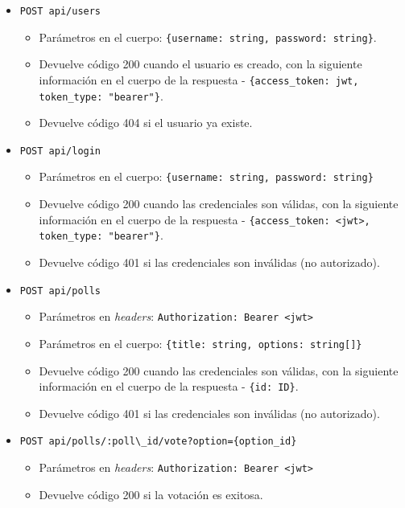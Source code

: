 \documentclass[11pt]{article}
\newcommand{\english}[1]{\textit{#1}}
\begin{document}
\begin{itemize}
    \item \lstinline|POST api/users|
    \begin{itemize}
        \item Parámetros en el cuerpo: \lstinline|{username: string, password: string}|.
        \item Devuelve código 200 cuando el usuario es creado, con la siguiente información en el cuerpo de la respuesta - \lstinline|{access_token: jwt, token_type: "bearer"}|.
        \item Devuelve código 404 si el usuario ya existe.
    \end{itemize}
    \item \lstinline|POST api/login|
    \begin{itemize}
        \item Parámetros en el cuerpo: \lstinline|{username: string, password: string}|
        \item Devuelve código 200 cuando las credenciales son válidas, con la siguiente información en el cuerpo de la respuesta - \lstinline|{access_token: <jwt>, token_type: "bearer"}|.
        \item Devuelve código 401 si las credenciales son inválidas (no autorizado).  
    \end{itemize}
    \item \lstinline|POST api/polls|
    \begin{itemize}
        \item Parámetros en \english{headers}: \lstinline|Authorization: Bearer <jwt>|
        \item Parámetros en el cuerpo: \lstinline|{title: string, options: string[]}|
        \item Devuelve código 200 cuando las credenciales son válidas, con la siguiente información en el cuerpo de la respuesta - \lstinline|{id: ID}|.
        \item Devuelve código 401 si las credenciales son inválidas (no autorizado).  
    \end{itemize}
    \item \lstinline|POST api/polls/:poll\_id/vote?option={option_id}|
    \begin{itemize}
        \item Parámetros en \english{headers}: \lstinline|Authorization: Bearer <jwt>|
        \item Devuelve código 200 si la votación es exitosa.
        \begin{itemize}

\end{itemize}
\end{itemize}
\end{itemize}
\end{document}
